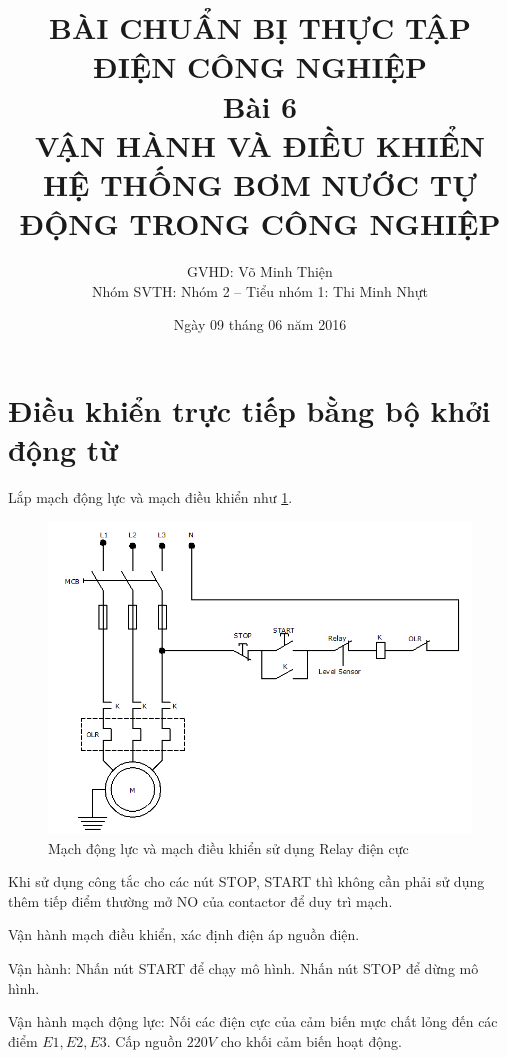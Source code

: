 \documentclass[13pt,a4paper]{extarticle}
\begin{document}
\title{\Large{\textbf{BÀI CHUẨN BỊ THỰC TẬP ĐIỆN CÔNG NGHIỆP}}\\\vspace{1cm}\textbf{Bài 6}\\\vspace{.5cm}\textbf{VẬN HÀNH VÀ ĐIỀU KHIỂN HỆ THỐNG BƠM NƯỚC TỰ ĐỘNG TRONG CÔNG NGHIỆP}}
\date{Ngày 09 tháng 06 năm 2016}
\author{GVHD: Võ Minh Thiện \vspace{.6cm}\\  Nhóm SVTH: Nhóm 2 -- Tiểu nhóm 1: Thi Minh Nhựt}
\maketitle
\tableofcontents
\newpage
{}
\setcounter{page}{1}
\section{Điều khiển trực tiếp bằng bộ khởi động từ}
Lắp mạch động lực và mạch điều khiển như \ref{Fig:relay-dien-cuc}.
\begin{figure}[!h]
\begin{center}
\includegraphics[scale=.7]{1}
\end{center}
\caption{Mạch động lực và mạch điều khiển sử dụng Relay điện cực}
\label{Fig:relay-dien-cuc}
\end{figure}

\begin{list}{--}{}
\item Khi sử dụng công tắc cho các nút STOP, START thì không cần phải sử dụng thêm tiếp điểm thường mở NO của contactor để duy trì mạch.
\item Vận hành mạch điều khiển, xác định điện áp nguồn điện.
\item Vận hành: Nhấn nút START để chạy mô hình. Nhấn nút STOP để dừng mô hình.
\item Vận hành mạch động lực: Nối các điện cực của cảm biến mực chất lỏng đến các điểm $E1,E2,E3$. Cấp nguồn $220V$ cho khối cảm biến hoạt động.
\end{list}
\end{document}
